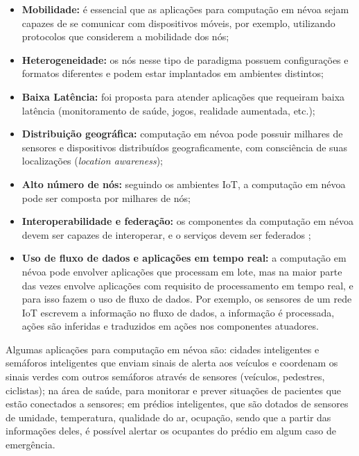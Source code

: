 \begin{itemize}

    \item \textbf{Mobilidade:} é essencial que as aplicações para computação em névoa sejam
    capazes de se comunicar com dispositivos móveis, por exemplo, utilizando
    protocolos que considerem a mobilidade dos nós;

    \item \textbf{Heterogeneidade:} os nós nesse tipo de paradigma possuem
    configurações e formatos diferentes e podem estar implantados em ambientes
    distintos;

    \item \textbf{Baixa Latência:}  foi proposta para
    atender aplicações que requeiram baixa latência (monitoramento de saúde,
    jogos, realidade aumentada, etc.);

    \item \textbf{Distribuição geográfica:} computação em névoa pode possuir
    milhares de sensores e dispositivos distribuídos geograficamente, com
    consciência de suas localizações (\emph{location awareness});

    \item \textbf{Alto número de nós:} seguindo os ambientes IoT, a computação
    em névoa pode ser composta por milhares de nós;

    \item \textbf{Interoperabilidade e federação:} os componentes da computação
    em névoa devem ser capazes de interoperar, e o serviços devem ser federados
    ;

    \item \textbf{Uso de fluxo de dados e aplicações em tempo real:} a
    computação em névoa pode envolver aplicações que processam em lote, mas na
    maior parte das vezes envolve aplicações com requisito de processamento em
    tempo real, e para isso fazem o uso de fluxo de dados. Por exemplo, os
    sensores de um rede IoT escrevem a informação no fluxo de dados, a
    informação é processada, ações são inferidas e traduzidos em
    ações nos componentes atuadores.

\end{itemize}

Algumas aplicações para computação em névoa são:
cidades inteligentes e
semáforos inteligentes que enviam sinais de alerta aos veículos e coordenam os
sinais verdes com outros semáforos através de sensores (veículos, pedestres,
ciclistas);
na área de saúde, para monitorar e prever situações de pacientes que
estão conectados a sensores;
em prédios inteligentes, que são dotados de sensores
de umidade, temperatura, qualidade do ar, ocupação, sendo que a partir das
informações deles, é possível alertar os ocupantes do prédio em algum caso de
emergência.

